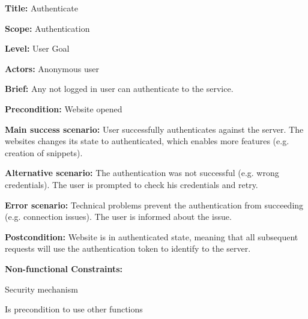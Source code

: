 
\begin{DoxyItemize}
\item {\bfseries Title\+:} Authenticate
\item {\bfseries Scope\+:} Authentication
\item {\bfseries Level\+:} User Goal
\item {\bfseries Actors\+:} Anonymous user
\item {\bfseries Brief\+:} Any not logged in user can authenticate to the service.
\end{DoxyItemize}


\begin{DoxyItemize}
\item {\bfseries Precondition\+:} Website opened
\item {\bfseries Main success scenario\+:} User successfully authenticates against the server. The websites changes its state to authenticated, which enables more features (e.\+g. creation of snippets).
\item {\bfseries Alternative scenario\+:} The authentication was not successful (e.\+g. wrong credentials). The user is prompted to check his credentials and retry.
\item {\bfseries Error scenario\+:} Technical problems prevent the authentication from succeeding (e.\+g. connection issues). The user is informed about the issue.
\item {\bfseries Postcondition\+:} Website is in authenticated state, meaning that all subsequent requests will use the authentication token to identify to the server.
\item {\bfseries Non-\/functional Constraints\+:}
\begin{DoxyItemize}
\item Security mechanism
\item Is precondition to use other functions 
\end{DoxyItemize}
\end{DoxyItemize}